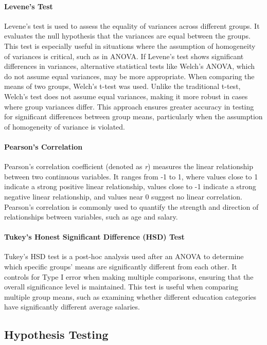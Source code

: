 \paragraph{Levene's Test}
Levene’s test is used to assess the equality of variances across different groups. It evaluates the null hypothesis that the variances are equal between the groups. This test is especially useful in situations where the assumption of homogeneity of variances is critical, such as in ANOVA. If Levene’s test shows significant differences in variances, alternative statistical tests like Welch’s ANOVA, which do not assume equal variances, may be more appropriate. When comparing the means of two groups, Welch’s t-test was used. Unlike the traditional t-test, Welch’s test does not assume equal variances, making it more robust in cases where group variances differ. This approach ensures greater accuracy in testing for significant differences between group means, particularly when the assumption of homogeneity of variance is violated.

\paragraph{Pearson’s Correlation}
Pearson's correlation coefficient (denoted as \textit{r}) measures the linear relationship between two continuous variables. It ranges from -1 to 1, where values close to 1 indicate a strong positive linear relationship, values close to -1 indicate a strong negative linear relationship, and values near 0 suggest no linear correlation. Pearson's correlation is commonly used to quantify the strength and direction of relationships between variables, such as age and salary.

\paragraph{Tukey’s Honest Significant Difference (HSD) Test}
Tukey’s HSD test is a post-hoc analysis used after an ANOVA to determine which specific groups' means are significantly different from each other. It controls for Type I error when making multiple comparisons, ensuring that the overall significance level is maintained. This test is useful when comparing multiple group means, such as examining whether different education categories have significantly different average salaries.

\subsection{Hypothesis Testing}

